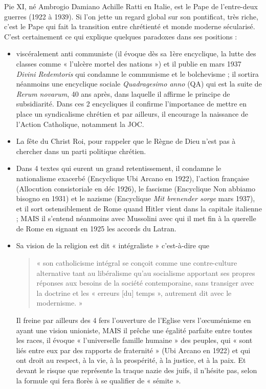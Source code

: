 Pie XI, né Ambrogio Damiano Achille Ratti en Italie, est le Pape de l’entre-deux guerres (1922 à 1939). Si l’on jette un regard global sur son pontificat, très riche, c’est le Pape qui fait la transition entre chrétienté et monde moderne sécularisé. C’est certainement ce qui explique quelques paradoxes dans ses positions : 
\begin{itemize}
    \item  viscéralement anti communiste (il évoque dès sa 1ère encyclique, la lutte des classes comme « l’ulcère mortel des nations ») et il publie en mars 1937 \textit{Divini Redemtoris} qui condamne le communisme et le bolchevisme  ;  il sortira néanmoins une encyclique sociale\textit{ Quadragesimo anno} (QA) qui est la suite de \textit{Rerum novarum}, 40 ans après, dans laquelle il affirme le principe de subsidiarité. Dans ces 2 encycliques il confirme l’importance de mettre en place un syndicalisme chrétien et par ailleurs, il encourage la naissance de l’Action Catholique, notamment la JOC.                 \item La fête du Christ Roi, pour rappeler que le Règne de Dieu n'est pas à chercher dans un parti politique chrétien.
    
  \item  Dans 4 textes qui eurent un grand retentissement, il condamne le nationalisme exacerbé (Encyclique Ubi Arcano en 1922), l’action française (Allocution consistoriale en déc 1926), le fascisme (Encyclique Non abbiamo bisogno en 1931) et le nazisme (Encyclique \textit{Mit brenender sorge} mars 1937), et il sort ostensiblement de Rome quand Hitler vient dans la capitale italienne ; MAIS il s’entend néanmoins avec Mussolini avec qui il met fin à la querelle de Rome en signant en 1925 les accords du Latran. 
  \item  Sa vision de la religion est dit « intégraliste » c’est-à-dire que 
  
  \begin{quote}
      « son catholicisme intégral se conçoit comme une contre-culture alternative tant au libéralisme qu’au socialisme apportant ses propres réponses aux besoins de la société contemporaine, sans transiger avec la doctrine et les « erreurs [du] temps », autrement dit avec le modernisme. »
  \end{quote} Il freine par ailleurs des 4 fers l’ouverture de l’Eglise vers l’œcuménisme en ayant une vision unioniste, MAIS il prêche une égalité parfaite entre toutes les races, il évoque « l’universelle famille humaine » des peuples, qui « sont liés entre eux par des rapports de fraternité » (Ubi Arcano en 1922) et qui ont droit au respect, à la vie, à la prospérité, à la justice, et à la paix. Et devant le risque que représente la traque nazie des juifs, il n’hésite pas, selon la formule qui fera florès à se qualifier de « sémite ». 

  
\end{itemize}

